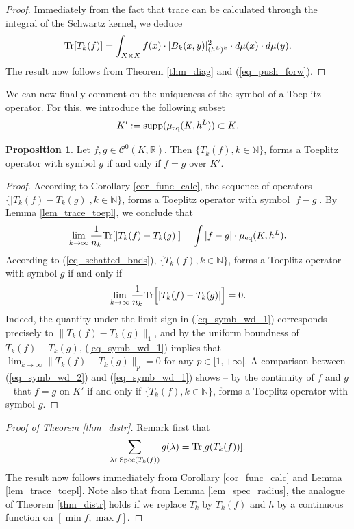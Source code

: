 \documentclass[12pt]{article}
\numberwithin{equation}{section}
\theoremstyle{theorem}
\theoremstyle{definition}
\newtheorem{prop}[thm]{Proposition}
\theoremstyle{remark}
\newcommand{\real}{\mathbb{R}}
\newcommand{\nat}{\mathbb{N}}
\newcommand{\ccal}{\mathscr{C}}
\begin{document}
	\begin{proof}
		Immediately from the fact that trace can be calculated through the integral of the Schwartz kernel, we deduce
		\begin{equation}
			{\rm{Tr}}[T_k(f)]
			=
			\int_{X \times X} f(x) \cdot |B_k(x, y)|^{2}_{(h^L)^k} \cdot d \mu(x) \cdot d \mu(y).
		\end{equation}
		The result now follows from Theorem \ref{thm_diag} and (\ref{eq_push_forw}).
	\end{proof}
	We can now finally comment on the uniqueness of the symbol of a Toeplitz operator.
	For this, we introduce the following subset
	\begin{equation}\label{eq_kprim}
		K' := {\rm{supp}}(\mu_{\mathrm{eq}}(K, h^L)) \subset K.
	\end{equation}
	
	
	\begin{prop}\label{prop_symb_well_def}
		Let $f, g \in \ccal^0(K, \real)$.
		Then $\{ T_k(f) , k \in \nat \}$, forms a Toeplitz operator with symbol $g$ if and only if $f = g$ over $K'$.
	\end{prop}
	\begin{proof}
		According to Corollary \ref{cor_func_calc}, the sequence of operators $\{ |T_k(f) - T_k(g)| , k \in \nat \}$, forms a Toeplitz operator with symbol $|f - g|$.
		By Lemma \ref{lem_trace_toepl}, we conclude that
		\begin{equation}\label{eq_symb_wd_2}
			\lim_{k \to \infty} \frac{1}{n_k} {\rm{Tr}}[|T_k(f) - T_k(g)|] = \int |f - g| \cdot \mu_{\mathrm{eq}}(K, h^L).
		\end{equation}
		According to (\ref{eq_schatted_bnds}), $\{ T_k(f) , k \in \nat \}$, forms a Toeplitz operator with symbol $g$ if and only if
		\begin{equation}\label{eq_symb_wd_1}
			\lim_{k \to \infty} \frac{1}{n_k} {\rm{Tr}} \Big[ |T_k(f) - T_k(g)| \Big] = 0.
		\end{equation}
		Indeed, the quantity under the limit sign in (\ref{eq_symb_wd_1}) corresponds precisely to $\| T_k(f) - T_k(g) \|_1$, and by the uniform boundness of $T_k(f) - T_k(g)$, (\ref{eq_symb_wd_1}) implies that $\lim_{k \to \infty}  \| T_k(f) - T_k(g) \|_p = 0$ for any $p \in [1, +\infty[$.
		A comparison between (\ref{eq_symb_wd_2}) and (\ref{eq_symb_wd_1}) shows -- by the continuity of $f$ and $g$ -- that $f = g$ on $K'$ if and only if $\{ T_k(f) , k \in \nat \}$, forms a Toeplitz operator with symbol $g$.
	\end{proof}
	\begin{proof}[Proof of Theorem \ref{thm_distr}]
		Remark first that 
		\begin{equation}
			\sum_{\lambda \in {\rm{Spec}} (T_k(f))} g(\lambda)
			=
			{\rm{Tr}}[g(T_k(f))].
		\end{equation}
		The result now follows immediately from Corollary \ref{cor_func_calc} and Lemma \ref{lem_trace_toepl}.
		Note also that from Lemma \ref{lem_spec_radius}, the analogue of Theorem \ref{thm_distr} holds if we replace $T_k$ by $T_k(f)$ and $h$ by a continuous function on $[\min f, \max f]$.
	\end{proof}
	
\end{document}
